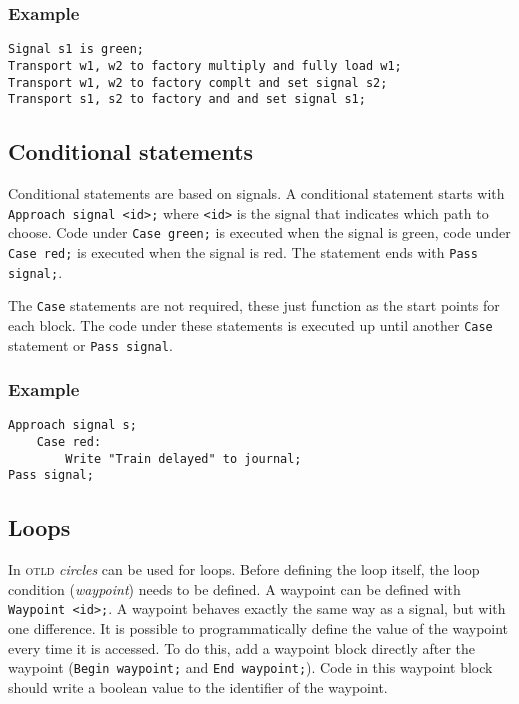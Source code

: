 \documentclass[10pt,a4paper,notitlepage]{article}
\newcommand{\shortname}{\textsc{otld} }
\begin{document}
\subsubsection*{Example}

\begin{lstlisting}
Signal s1 is green;
Transport w1, w2 to factory multiply and fully load w1;
Transport w1, w2 to factory complt and set signal s2;
Transport s1, s2 to factory and and set signal s1;
\end{lstlisting}

\subsection{Conditional statements}

Conditional statements are based on signals. A conditional statement starts with \texttt{Approach signal <id>;} where \texttt{<id>} is the signal that indicates which path to choose. Code under \texttt{Case green;} is executed when the signal is green, code under \texttt{Case red;} is executed when the signal is red. The statement ends with \texttt{Pass signal;}.

The \texttt{Case} statements are not required, these just function as the start points for each block. The code under these statements is executed up until another \texttt{Case} statement or \texttt{Pass signal}.

\subsubsection*{Example}

\begin{lstlisting}
Approach signal s;
	Case red:
		Write "Train delayed" to journal;
Pass signal;
\end{lstlisting}

\subsection{Loops}

In \shortname \emph{circles} can be used for loops. Before defining the loop itself, the loop condition (\emph{waypoint}) needs to be defined. A waypoint can be defined with \texttt{Waypoint <id>;}. A waypoint behaves exactly the same way as a signal, but with one difference. It is possible to programmatically define the value of the waypoint every time it is accessed. To do this, add a waypoint block directly after the waypoint (\texttt{Begin waypoint;} and \texttt{End waypoint;}). Code in this waypoint block should write a boolean value to the identifier of the waypoint.
\end{document}
